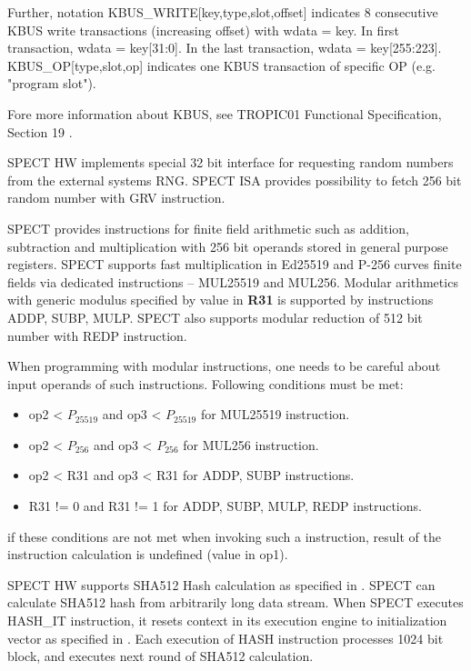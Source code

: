 \documentclass{tropic_design_spec}
\begin{document}
Further, notation KBUS_WRITE[key,type,slot,offset] indicates 8 consecutive KBUS write transactions (increasing offset)
with wdata = key. In first transaction, wdata = key[31:0]. In the last transaction, wdata = key[255:223].
KBUS_OP[type,slot,op] indicates one KBUS transaction of specific OP (e.g. "program slot").

Fore more information about KBUS, see TROPIC01 Functional Specification, Section 19 \cite{TROPIC01}.


SPECT HW implements special 32 bit interface for requesting random numbers from the external systems RNG.
SPECT ISA provides possibility to fetch 256 bit random number with GRV instruction.


SPECT provides instructions for finite field arithmetic such as
addition, subtraction and multiplication with 256 bit operands stored in general purpose
registers. SPECT supports fast multiplication in Ed25519 and P-256 curves finite fields 
via dedicated instructions -- MUL25519 and MUL256. Modular arithmetics with generic modulus
specified by value in \textbf{R31} is supported by instructions ADDP, SUBP, MULP. SPECT
also supports modular reduction of 512 bit number with REDP instruction.

When programming with modular instructions, one needs to be careful about input
operands of such instructions. Following conditions must be met:
\begin{itemize}
    \item op2 < $P_{25519}$ and op3 < $P_{25519}$ for MUL25519 instruction.
    \item op2 < $P_{256}$ and op3 < $P_{256}$ for MUL256 instruction.
    \item op2 < R31 and op3 < R31 for ADDP, SUBP instructions.
    \item R31 != 0 and R31 != 1 for ADDP, SUBP, MULP, REDP instructions.
\end{itemize}
if these conditions are not met when invoking such a instruction, result
of the instruction calculation is undefined (value in op1).



SPECT HW supports SHA512 Hash calculation as specified in \cite{SHA512SPEC}. SPECT can
calculate SHA512 hash from arbitrarily long data stream. When SPECT executes HASH_IT
instruction, it resets context in its execution engine to initialization
vector as specified in \cite{SHA512SPEC}. Each execution of HASH instruction
processes 1024 bit block, and executes next round of SHA512 calculation.
\end{document}
